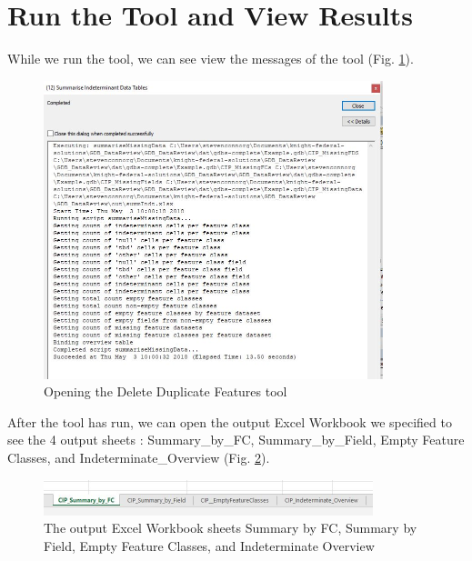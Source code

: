 \documentclass[openany]{book}
\theoremstyle{definition}
\theoremstyle{definition}
\theoremstyle{definition}
\theoremstyle{remark}
\begin{document}
\section{Run the Tool and View
Results}\label{run-the-tool-and-view-results-9}

While we run the tool, we can see view the messages of the tool (Fig.
\ref{fig:summIndtmessages}).

\begin{figure}[H]

{\centering \includegraphics[width=3.89in,]{figures/summIndt-messages} 

}

\caption{Opening the Delete Duplicate Features tool}\label{fig:summIndtmessages}
\end{figure}

After the tool has run, we can open the output Excel Workbook we
specified to see the 4 output sheets : Summary\_by\_FC,
Summary\_by\_Field, Empty Feature Classes, and Indeterminate\_Overview
(Fig. \ref{fig:summIndtsheets}).

\begin{figure}[H]

{\centering \includegraphics[width=3.77in,]{figures/summIndt-sheets} 

}

\caption{The output Excel Workbook sheets Summary by FC, Summary by Field, Empty Feature Classes, and Indeterminate Overview}\label{fig:summIndtsheets}
\end{figure}
\end{document}

